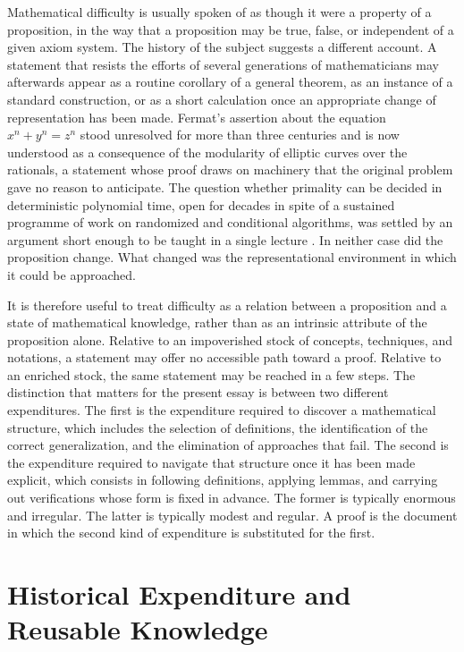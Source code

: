 \documentclass[11pt,letterpaper]{report}
\theoremstyle{plain}
\theoremstyle{definition}
\theoremstyle{remark}
\begin{document}
Mathematical difficulty is usually spoken of as though it were a property of a proposition, in the way that a proposition may be true, false, or independent of a given axiom system. The history of the subject suggests a different account. A statement that resists the efforts of several generations of mathematicians may afterwards appear as a routine corollary of a general theorem, as an instance of a standard construction, or as a short calculation once an appropriate change of representation has been made. Fermat's assertion about the equation $x^n+y^n=z^n$ stood unresolved for more than three centuries and is now understood as a consequence of the modularity of elliptic curves over the rationals, a statement whose proof draws on machinery that the original problem gave no reason to anticipate. The question whether primality can be decided in deterministic polynomial time, open for decades in spite of a sustained programme of work on randomized and conditional algorithms, was settled by an argument short enough to be taught in a single lecture \cite{AKS2004}. In neither case did the proposition change. What changed was the representational environment in which it could be approached.

It is therefore useful to treat difficulty as a relation between a proposition and a state of mathematical knowledge, rather than as an intrinsic attribute of the proposition alone. Relative to an impoverished stock of concepts, techniques, and notations, a statement may offer no accessible path toward a proof. Relative to an enriched stock, the same statement may be reached in a few steps. The distinction that matters for the present essay is between two different expenditures. The first is the expenditure required to discover a mathematical structure, which includes the selection of definitions, the identification of the correct generalization, and the elimination of approaches that fail. The second is the expenditure required to navigate that structure once it has been made explicit, which consists in following definitions, applying lemmas, and carrying out verifications whose form is fixed in advance. The former is typically enormous and irregular. The latter is typically modest and regular. A proof is the document in which the second kind of expenditure is substituted for the first.

\section{Historical Expenditure and Reusable Knowledge}
\end{document}
